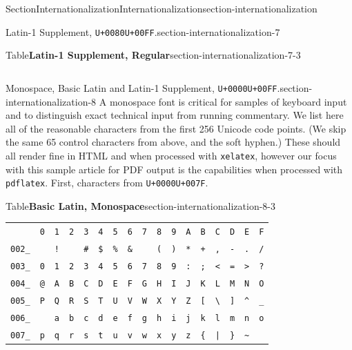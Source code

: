 \documentclass[twoside,10pt,]{article}
\newcommand{\tabularfont}{\relax}
\newcommand{\mono}[1]{\texttt{#1}}
\numberwithin{equation}{section}
\begin{document}
\begin{sectionptx}{Section}{Internationalization}{}{Internationalization}{}{}{section-internationalization}
\begin{paragraphs}{Latin-1 Supplement, \mono{U+0080}\textendash{}\mono{U+00FF}.}{section-internationalization-7}
\begin{tableptx}{Table}{\textbf{Latin-1 Supplement, Regular}}{section-internationalization-7-3}{}
{\begin{tabular}{lllllllllllllllll}
\end{tabular}
}%
\end{tableptx}%
\end{paragraphs}%
\begin{paragraphs}{Monospace, Basic Latin and Latin-1 Supplement, \mono{U+0000}\textendash{}\mono{U+00FF}.}{section-internationalization-8}%
A monospace font is critical for samples of keyboard input and to distinguish exact technical input from running commentary.  We list here all of the reasonable characters from the first 256 Unicode code points.  (We skip the same 65 control characters from above, and the soft hyphen.)  These should all render fine in HTML and when processed with \mono{xelatex}, however our focus with this sample article for PDF output is the capabilities when processed with \mono{pdflatex}.  First, characters from \mono{U+0000}\textendash{}\mono{U+007F}.%
\begin{tableptx}{Table}{\textbf{Basic Latin, Monospace}}{section-internationalization-8-3}{}%
\centering%
{\tabularfont%
\begin{tabular}{lllllllllllllllll}
&\mono{0}&\mono{1}&\mono{2}&\mono{3}&\mono{4}&\mono{5}&\mono{6}&\mono{7}&\mono{8}&\mono{9}&\mono{A}&\mono{B}&\mono{C}&\mono{D}&\mono{E}&\mono{F}\tabularnewline[0pt]
\mono{002\_}&\mono{ }&\mono{!}&\mono{\textquotedbl{}}&\mono{\#}&\mono{\$}&\mono{\%}&\mono{\&}&\mono{\textquotesingle{}}&\mono{(}&\mono{)}&\mono{*}&\mono{+}&\mono{,}&\mono{-}&\mono{.}&\mono{/}\tabularnewline[0pt]
\mono{003\_}&\mono{0}&\mono{1}&\mono{2}&\mono{3}&\mono{4}&\mono{5}&\mono{6}&\mono{7}&\mono{8}&\mono{9}&\mono{:}&\mono{;}&\mono{<}&\mono{=}&\mono{>}&\mono{?}\tabularnewline[0pt]
\mono{004\_}&\mono{@}&\mono{A}&\mono{B}&\mono{C}&\mono{D}&\mono{E}&\mono{F}&\mono{G}&\mono{H}&\mono{I}&\mono{J}&\mono{K}&\mono{L}&\mono{M}&\mono{N}&\mono{O}\tabularnewline[0pt]
\mono{005\_}&\mono{P}&\mono{Q}&\mono{R}&\mono{S}&\mono{T}&\mono{U}&\mono{V}&\mono{W}&\mono{X}&\mono{Y}&\mono{Z}&\mono{[}&\mono{\textbackslash{}}&\mono{]}&\mono{\textasciicircum{}}&\mono{\_}\tabularnewline[0pt]
\mono{006\_}&\mono{\textasciigrave{}}&\mono{a}&\mono{b}&\mono{c}&\mono{d}&\mono{e}&\mono{f}&\mono{g}&\mono{h}&\mono{i}&\mono{j}&\mono{k}&\mono{l}&\mono{m}&\mono{n}&\mono{o}\tabularnewline[0pt]
\mono{007\_}&\mono{p}&\mono{q}&\mono{r}&\mono{s}&\mono{t}&\mono{u}&\mono{v}&\mono{w}&\mono{x}&\mono{y}&\mono{z}&\mono{\{}&\mono{|}&\mono{\}}&\mono{\textasciitilde{}}&
\end{tabular}
}%
\end{tableptx}%

\end{paragraphs}
\end{sectionptx}
\end{document}
